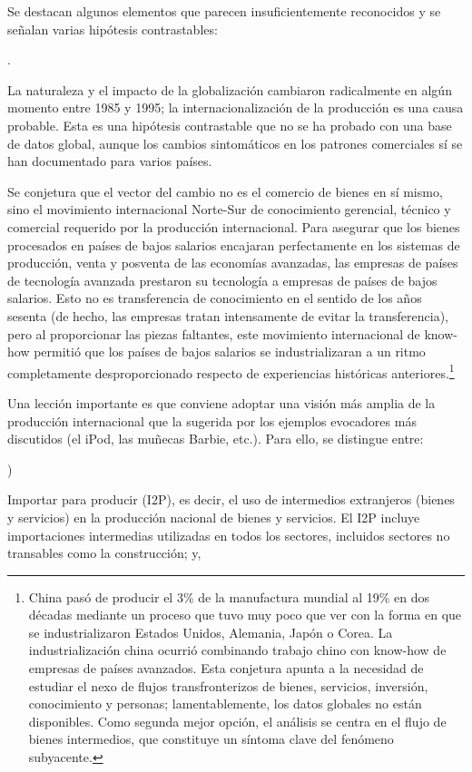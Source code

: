\documentclass[10pt,a4paper]{article}
\newcounter{alphaitem}
\newcounter{numitem}
\newenvironment{la}
      {\begin{list}{\alph{alphaitem})}{%
          \usecounter{alphaitem}%
          \setlength{\leftmargin}{1cm}%
          \setlength{\parskip}{3pt}%
          \setlength{\itemsep}{0pt}%
          \setlength{\parsep}{0pt}%
      }}
      {\end{list}}
\newenvironment{lnum}
      {\begin{list}{\arabic{numitem}.}{%
          \usecounter{numitem}%
          \setlength{\leftmargin}{1cm}%
          \setlength{\parskip}{3pt}%
          \setlength{\itemsep}{0pt}%
          \setlength{\parsep}{0pt}%
      }}
      {\end{list}}
\begin{document}
Se destacan algunos elementos que parecen insuficientemente reconocidos y se señalan varias hipótesis contrastables:
\begin{lnum}
    \item La naturaleza y el impacto de la globalización cambiaron radicalmente en algún momento entre 1985 y 1995; la internacionalización de la producción es una causa probable. Esta es una hipótesis contrastable que no se ha probado con una base de datos global, aunque los cambios sintomáticos en los patrones comerciales sí se han documentado para varios países.
    \item Se conjetura que el vector del cambio no es el comercio de bienes en sí mismo, sino el movimiento internacional Norte-Sur de conocimiento gerencial, técnico y comercial requerido por la producción internacional. Para asegurar que los bienes procesados en países de bajos salarios encajaran perfectamente en los sistemas de producción, venta y posventa de las economías avanzadas, las empresas de países de tecnología avanzada prestaron su tecnología a empresas de países de bajos salarios. Esto no es transferencia de conocimiento en el sentido de los años sesenta (de hecho, las empresas tratan intensamente de evitar la transferencia), pero al proporcionar las piezas faltantes, este movimiento internacional de know-how permitió que los países de bajos salarios se industrializaran a un ritmo completamente desproporcionado respecto de experiencias históricas anteriores.\footnote{%
        China pasó de producir el 3\% de la manufactura mundial al 19\% en dos décadas mediante un proceso que tuvo muy poco que ver con la forma en que se industrializaron Estados Unidos, Alemania, Japón o Corea. La industrialización china ocurrió combinando trabajo chino con know-how de empresas de países avanzados. Esta conjetura apunta a la necesidad de estudiar el nexo de flujos transfronterizos de bienes, servicios, inversión, conocimiento y personas; lamentablemente, los datos globales no están disponibles. Como segunda mejor opción, el análisis se centra en el flujo de bienes intermedios, que constituye un síntoma clave del fenómeno subyacente.
    }
    \item Una lección importante es que conviene adoptar una visión más amplia de la producción internacional que la sugerida por los ejemplos evocadores más discutidos (el iPod, las muñecas Barbie, etc.). Para ello, se distingue entre:
    \begin{la}
        \item Importar para producir (I2P), es decir, el uso de intermedios extranjeros (bienes y servicios) en la producción nacional de bienes y servicios. El I2P incluye importaciones intermedias utilizadas en todos los sectores, incluidos sectores no transables como la construcción; y,

\end{la}
\end{lnum}
\end{document}
